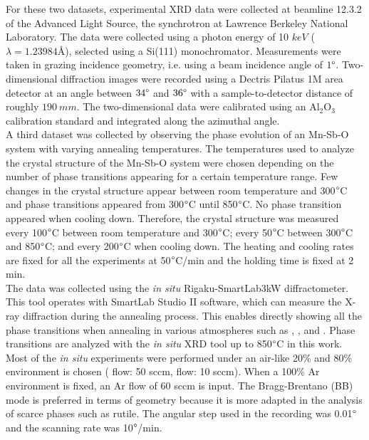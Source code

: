 For these two datasets, experimental XRD data were collected at beamline 12.3.2 of the Advanced Light Source, the synchrotron at Lawrence Berkeley National Laboratory. The data were collected using a photon energy of 10 $\si{keV}$ ($\lambda = 1.23984 \text{\AA}$), selected using a Si(111) monochromator. Measurements were taken in grazing incidence geometry, i.e. using a beam incidence angle of $1\degree$. Two-dimensional diffraction images were recorded using a Dectris Pilatus 1M area detector at an angle between $34\degree$ and $36\degree$ with a sample-to-detector distance of roughly $190 \ \si{mm}$. The two-dimensional data were calibrated using an Al$_{2}$O$_{3}$ calibration standard and integrated along the azimuthal angle. \\


A third dataset was collected by observing the phase evolution of an Mn-Sb-O system with varying annealing temperatures. The temperatures used to analyze the crystal structure of the Mn-Sb-O system were chosen depending on the number of phase transitions appearing for a certain temperature range. Few changes in the crystal structure appear between room temperature and 300$\degree$C and phase transitions appeared from 300$\degree$C until 850$\degree$C. No phase transition appeared when cooling down. Therefore, the crystal structure was measured every 100$\degree$C between room temperature and 300$\degree$C; every 50$\degree$C between 300$\degree$C and 850$\degree$C; and every 200$\degree$C when cooling down. The heating and cooling rates are fixed for all the experiments at 50$\degree$C/min and the holding time is fixed at 2 min. \\

The data was collected using the \textit{in situ}  Rigaku-SmartLab3kW diffractometer. This tool operates with SmartLab Studio II software, which can measure the X-ray diffraction during the annealing process. This enables directly showing all the phase transitions when annealing in various atmospheres such as , , and . Phase transitions are analyzed with the \textit{in situ} XRD tool up to 850$\degree$C in this work. Most of the \textit{in situ} experiments were performed under an air-like 20\%  and 80\%  environment is chosen ( flow: 50 \si{sccm},  flow: 10 \si{sccm}). When a 100\% Ar environment is fixed, an Ar flow of 60 \si{sccm} is input. The Bragg-Brentano (BB) mode is preferred in terms of geometry because it is more adapted in the analysis of scarce phases such as   rutile. The angular step used in the recording was 0.01$\degree$ and the scanning rate was 10$\degree$/min. 




